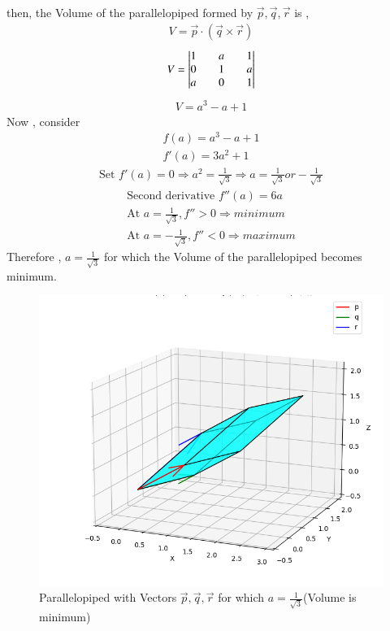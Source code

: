 \documentclass[journal]{IEEEtran}
\begin{document}
then, the Volume of the parallelopiped formed by $\vec{p},\vec{q},\vec{r}$ is ,
\begin{align}
    V = \vec{p}\cdot(\vec{q}\times\vec{r})
\end{align}
\begin{align}
V=\begin{vmatrix}
    1 && a && 1\\
    0 && 1 && a\\
    a && 0 && 1
    \end{vmatrix}
\end{align}
\begin{align}
    V=a^3-a+1
\end{align}
Now , consider
\begin{align}
    f(a)=a^3-a+1\\
    f'(a)=3a^2+1
\end{align}
\begin{align*}
\text{Set }f'(a)=0  \Rightarrow a^2=\frac{1}{\sqrt{3}} \Rightarrow a=\frac{1}{\sqrt{3}} or -\frac{1}{\sqrt{3}} 
\end{align*}
\begin{align}
\text{Second derivative }f''(a)=6a\\
\text{At }a=\frac{1}{\sqrt{3}},f''>0 \Rightarrow minimum\\
\text{At }a=-\frac{1}{\sqrt{3}},f''<0 \Rightarrow maximum
\end{align}
Therefore , $a=\frac{1}{\sqrt{3}}$ for which the Volume of the parallelopiped becomes minimum.
\begin{figure}[h!]
  \centering
  \includegraphics[width=0.7\columnwidth]{figs/fig.png} 
   \caption*{Parallelopiped with Vectors $\vec{p},\vec{q},\vec{r}$ for which $a=\frac{1}{\sqrt{3}}$(Volume is minimum)}
  \label{Fig1}
\end{figure}
\end{document}
